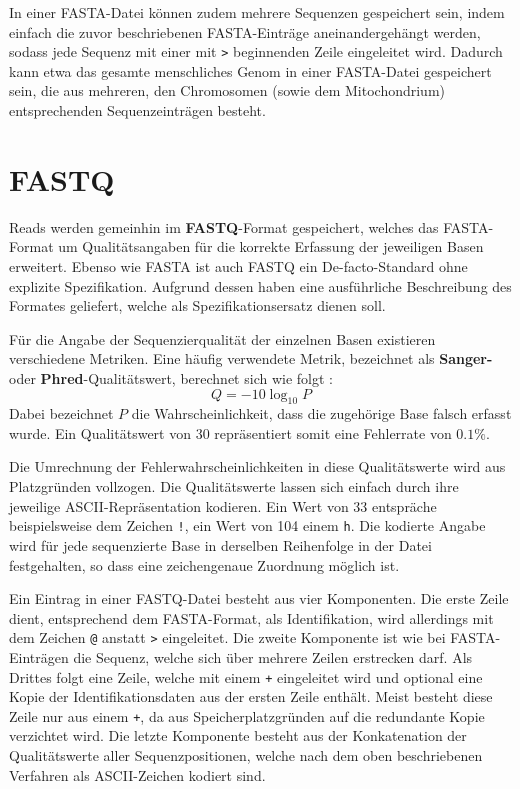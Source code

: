 In einer FASTA-Datei können zudem mehrere Sequenzen gespeichert sein, indem einfach die zuvor beschriebenen FASTA-Einträge aneinandergehängt werden, sodass jede Sequenz mit einer mit \texttt{>} beginnenden Zeile eingeleitet wird.
Dadurch kann etwa das gesamte menschliches Genom in einer FASTA-Datei gespeichert sein, die aus mehreren, den Chromosomen (sowie dem Mitochondrium) entsprechenden Sequenzeinträgen besteht.

\section{FASTQ}
\label{sec:data:fastq}
Reads werden gemeinhin im \textbf{FASTQ}-Format gespeichert, welches das FASTA-Format um Qualitätsangaben für die korrekte Erfassung der jeweiligen Basen erweitert.
Ebenso wie FASTA ist auch FASTQ ein De-facto-Standard ohne explizite Spezifikation.
Aufgrund dessen haben \citet{Cock2010} eine ausführliche Beschreibung des Formates geliefert, welche als Spezifikationsersatz dienen soll.

Für die Angabe der Sequenzierqualität der einzelnen Basen existieren verschiedene Metriken.
Eine häufig verwendete Metrik, bezeichnet als \textbf{Sanger-} oder \textbf{Phred}-Qualitätswert, berechnet sich wie folgt \citep{Ewing1998}:
\begin{equation}
    Q = -10 \log_{10} P
\end{equation}
Dabei bezeichnet $P$ die Wahrscheinlichkeit, dass die zugehörige Base falsch erfasst wurde.
Ein Qualitätswert von $30$ repräsentiert somit eine Fehlerrate von $0.1 \%$.

Die Umrechnung der Fehlerwahrscheinlichkeiten in diese Qualitätswerte wird aus Platzgründen vollzogen.
Die Qualitätswerte lassen sich einfach durch ihre jeweilige ASCII-Repräsentation kodieren.
Ein Wert von 33 entspräche beispielsweise dem Zeichen \texttt{!}, ein Wert von 104 einem \texttt{h}.
Die kodierte Angabe wird für jede sequenzierte Base in derselben Reihenfolge in der Datei festgehalten, so dass eine zeichengenaue Zuordnung möglich ist.

Ein Eintrag in einer FASTQ-Datei besteht aus vier Komponenten.
Die erste Zeile dient, entsprechend dem FASTA-Format, als Identifikation, wird allerdings mit dem Zeichen \texttt{@} anstatt \texttt{>} eingeleitet.
Die zweite Komponente ist wie bei FASTA-Einträgen die Sequenz, welche sich über mehrere Zeilen erstrecken darf.
Als Drittes folgt eine Zeile, welche mit einem \texttt{+} eingeleitet wird und optional eine Kopie der Identifikationsdaten aus der ersten Zeile enthält.
Meist besteht diese Zeile nur aus einem \texttt{+}, da aus Speicherplatzgründen auf die redundante Kopie verzichtet wird.
Die letzte Komponente besteht aus der Konkatenation der Qualitätswerte aller Sequenzpositionen, welche nach dem oben beschriebenen Verfahren als ASCII-Zeichen kodiert sind.

